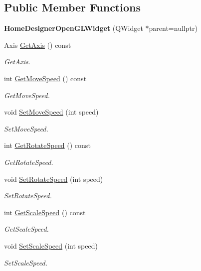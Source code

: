 \subsection*{Public Member Functions}
\begin{DoxyCompactItemize}
\item 
\hypertarget{class_home_designer_open_g_l_widget_a24232a9ac7981b4410a8fad3d3773ef5}{}{\bfseries Home\+Designer\+Open\+G\+L\+Widget} (Q\+Widget $\ast$parent=nullptr)\label{class_home_designer_open_g_l_widget_a24232a9ac7981b4410a8fad3d3773ef5}

\item 
Axis \hyperlink{class_home_designer_open_g_l_widget_a9e4a4bfa55e86426d28ba0589035cec9}{Get\+Axis} () const 
\begin{DoxyCompactList}\small\item\em Get\+Axis. \end{DoxyCompactList}\item 
int \hyperlink{class_home_designer_open_g_l_widget_a766ed7c727cfbe473064fd244dede73d}{Get\+Move\+Speed} () const 
\begin{DoxyCompactList}\small\item\em Get\+Move\+Speed. \end{DoxyCompactList}\item 
void \hyperlink{class_home_designer_open_g_l_widget_a36605922069ae365da069207b97a058c}{Set\+Move\+Speed} (int speed)
\begin{DoxyCompactList}\small\item\em Set\+Move\+Speed. \end{DoxyCompactList}\item 
int \hyperlink{class_home_designer_open_g_l_widget_abdfd4baea7b439683ce0e87278335035}{Get\+Rotate\+Speed} () const 
\begin{DoxyCompactList}\small\item\em Get\+Rotate\+Speed. \end{DoxyCompactList}\item 
void \hyperlink{class_home_designer_open_g_l_widget_a8987eaba2c2dd6b0d5f1348c7a80db1c}{Set\+Rotate\+Speed} (int speed)
\begin{DoxyCompactList}\small\item\em Set\+Rotate\+Speed. \end{DoxyCompactList}\item 
int \hyperlink{class_home_designer_open_g_l_widget_a4eefb0e0be806ebd74ea6b13cfa941ee}{Get\+Scale\+Speed} () const 
\begin{DoxyCompactList}\small\item\em Get\+Scale\+Speed. \end{DoxyCompactList}\item 
void \hyperlink{class_home_designer_open_g_l_widget_a3bbe46ba314a8ef0a7a380fa7e8bbbdc}{Set\+Scale\+Speed} (int speed)
\begin{DoxyCompactList}\small\item\em Set\+Scale\+Speed. \end{DoxyCompactList}\end{DoxyCompactItemize}
